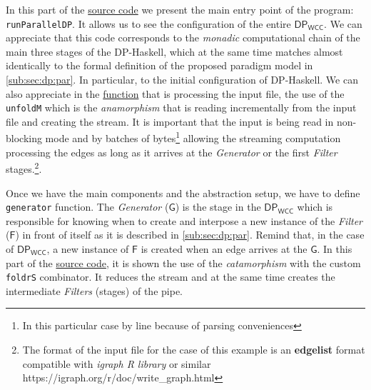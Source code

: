 \documentclass[preprint]{elsarticle}
\newcommand{\dpwcc}{\mathsf{DP_{WCC}}}
\newcommand{\fwcc}{\mathsf{F}}
\newcommand{\gwcc}{\mathsf{G}}
\begin{document}
In this part of the \href{https://github.com/jproyo/upc-miri-tfm/blob/17ee929f64a8be8a88ced782bfcf6bf355d8580a/connected-comp/src/ConnComp/Internal.hs#L20-L27}{source code} we present the main entry point of the program: \texttt{runParallelDP}. It allows us to see the configuration of the entire $\dpwcc$. We can appreciate that this code corresponds to the \textit{monadic} computational chain of the main three stages of the DP-Haskell, which at the same time matches almost identically to the formal definition of the proposed paradigm model in \autoref{sub:sec:dp:par}. In particular, to the initial configuration of DP-Haskell. We can also appreciate in the \href{https://github.com/jproyo/upc-miri-tfm/blob/17ee929f64a8be8a88ced782bfcf6bf355d8580a/connected-comp/src/ConnComp/Internal.hs#L84-L85}{function} that is processing the input file, the use of the \texttt{unfoldM} which is the \emph{anamorphism} that is reading incrementally from the input file and creating the stream. It is important that the input is being read in non-blocking mode and by batches of bytes\footnote{In this particular case by line because of parsing conveniences} allowing the streaming computation processing the edges as long as it arrives at the \textit{Generator} or the first \textit{Filter} stages.\footnote{The format of the input file for the case of this example is an \textbf{edgelist} format compatible with \emph{igraph R library} or similar https://igraph.org/r/doc/write\_graph.html}.

Once we have the main components and the abstraction setup, we have to define \texttt{generator} function. The \textit{Generator} ($\gwcc$) is the stage in the $\dpwcc$ which is responsible for knowing when to create and interpose a new instance of the \textit{Filter} ($\fwcc$) in front of itself as it is described in \autoref{sub:sec:dp:par}. Remind that, in the case of $\dpwcc$, a new instance of $\fwcc$ is created when an edge arrives at the $\gwcc$. In this part of the \href{https://github.com/jproyo/upc-miri-tfm/blob/17ee929f64a8be8a88ced782bfcf6bf355d8580a/connected-comp/src/ConnComp/Internal.hs#L35-L73}{source code}, it is shown the use of the \textit{catamorphism} with the custom \texttt{foldrS} combinator. It reduces the stream and at the same time creates the intermediate \textit{Filters} (stages) of the pipe.
\fi

\end{document}

